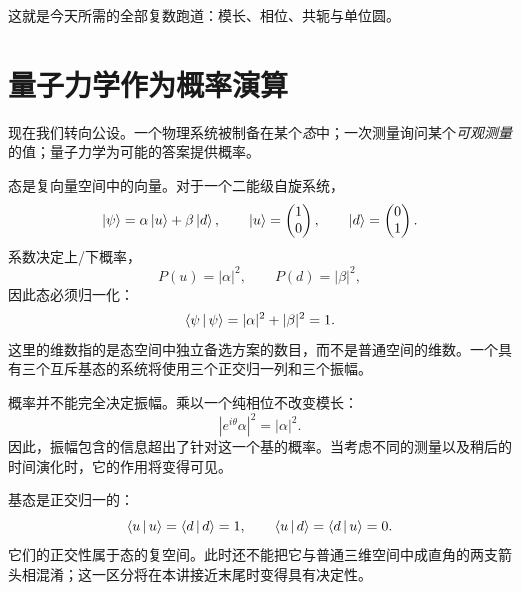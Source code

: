 \begin{classroomqa}
\end{classroomqa}

这就是今天所需的全部复数跑道：模长、相位、共轭与单位圆。

\section{量子力学作为概率演算}

现在我们转向公设。一个物理系统被制备在某个\emph{态}中；一次测量询问某个\emph{可观测量}的值；量子力学为可能的答案提供概率。

态是复向量空间中的向量。对于一个二能级自旋系统，
\begin{equation}
  \left\lvert\psi\right\rangle=\alpha\left\lvert u\right\rangle+\beta\left\lvert d\right\rangle,
  \qquad
  \left\lvert u\right\rangle=\begin{pmatrix}1\\0\end{pmatrix},
  \qquad
  \left\lvert d\right\rangle=\begin{pmatrix}0\\1\end{pmatrix}.
  \label{eq:l03-two-level-state}
\end{equation}
系数决定上/下概率，
\begin{equation}
  P(u)=|\alpha|^2,
  \qquad
  P(d)=|\beta|^2,
\end{equation}
因此态必须归一化：
\begin{equation}
  \left\langle\psi\,\middle|\,\psi\right\rangle
  =|\alpha|^2+|\beta|^2
  =1.
  \label{eq:l03-state-normalization}
\end{equation}
这里的维数指的是态空间中独立备选方案的数目，而不是普通空间的维数。一个具有三个互斥基态的系统将使用三个正交归一列和三个振幅。

概率并不能完全决定振幅。乘以一个纯相位不改变模长：
\begin{equation}
  |e^{i\theta}\alpha|^2=|\alpha|^2.
\end{equation}
因此，振幅包含的信息超出了针对这一个基的概率。当考虑不同的测量以及稍后的时间演化时，它的作用将变得可见。

基态是正交归一的：
\begin{equation}
  \left\langle u\,\middle|\,u\right\rangle=\left\langle d\,\middle|\,d\right\rangle=1,
  \qquad
  \left\langle u\,\middle|\,d\right\rangle=\left\langle d\,\middle|\,u\right\rangle=0.
\end{equation}
它们的正交性属于态的复空间。此时还不能把它与普通三维空间中成直角的两支箭头相混淆；这一区分将在本讲接近末尾时变得具有决定性。

